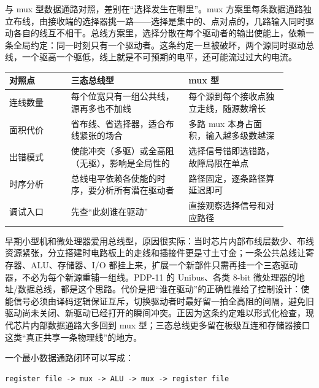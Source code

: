 与 mux 型数据通路对照，差别在“选择发生在哪里”。mux 方案里每条数据通路独立布线，由接收端的选择器挑一路——选择是集中的、点对点的，几路输入同时驱动各自的线互不相干。总线方案里，选择分散在每个驱动者的输出使能上，依赖一条全局约定：同一时刻只有一个驱动者。这条约定一旦被破坏，两个源同时驱动总线，一个驱高一个驱低，线上就是不可预期的电平，还可能流过过大的电流。

\begin{longtable}{L{0.2\linewidth}L{0.38\linewidth}L{0.32\linewidth}}
\toprule
对照点 & 三态总线型 & mux 型 \\
\midrule
连线数量 & 每个位宽只有一组公共线，源再多也不加线 & 每个源到每个接收点独立走线，随源数增长 \\
面积代价 & 省布线、省选择器，适合布线紧张的场合 & 多路 mux 本身占面积，输入越多级数越深 \\
出错模式 & 使能冲突（多驱）或全高阻（无驱），影响是全局性的 & 选择信号错即选错路，故障局限在单点 \\
时序分析 & 总线电平依赖各使能的时序，要分析所有潜在驱动者 & 路径固定，逐条路径算延迟即可 \\
调试入口 & 先查“此刻谁在驱动” & 直接观察选择信号和对应路径 \\
\bottomrule
\end{longtable}

早期小型机和微处理器爱用总线型，原因很实际：当时芯片内部布线层数少、布线资源紧张，分立搭建时电路板上的走线和插接件更是寸土寸金；一条公共总线让寄存器、ALU、存储器、I/O 都挂上来，扩展一个新部件只需再挂一个三态驱动器，不必为每个新源重铺一组线。PDP-11 的 Unibus、各类 8-bit 微处理器的地址/数据总线，都是这个思路。代价是把“谁在驱动”的正确性推给了控制设计：使能信号必须由译码逻辑保证互斥，切换驱动者时最好留一拍全高阻的间隔，避免旧驱动尚未关闭、新驱动已经打开的瞬间冲突。正因为这条约定难以形式化检查，现代芯片内部数据通路大多回到 mux 型；三态总线更多留在板级互连和存储器接口这类“真正共享一条物理线”的地方。

一个最小数据通路闭环可以写成：

\begin{lstlisting}
register file -> mux -> ALU -> mux -> register file
\end{lstlisting}

